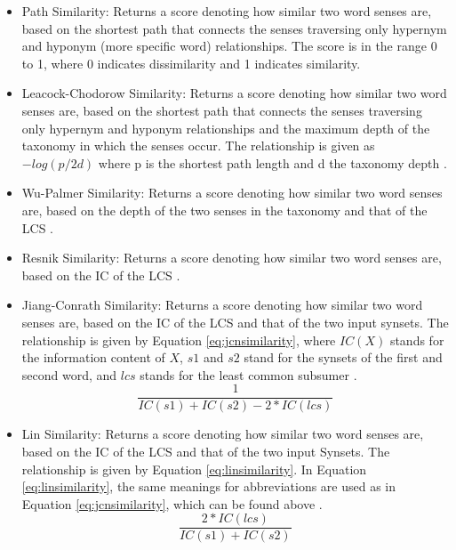 \documentclass{article}
\begin{document}
\begin{itemize}
	\item Path Similarity: Returns a score denoting how similar two word senses are, based on the shortest path that connects the senses traversing only hypernym and hyponym (more specific word) relationships. The score is in the range 0 to 1, where 0 indicates dissimilarity and 1 indicates similarity.
	\item Leacock-Chodorow Similarity: Returns a score denoting how similar two word senses are, based on the shortest path that connects the senses traversing only hypernym and hyponym relationships and the maximum depth of the taxonomy in which the senses occur. The relationship is given as \(-log(p/2d)\) where p is the shortest path length and d the taxonomy depth \cite{leacock1998combining}.
	\item Wu-Palmer Similarity: Returns a score denoting how similar two word senses are, based on the depth of the two senses in the taxonomy and that of the LCS \cite{wu1994verbs}.
	\item Resnik Similarity: Returns a score denoting how similar two word senses are, based on the IC of the LCS \cite{resnik1995using}.
	\item Jiang-Conrath Similarity: Returns a score denoting how similar two word senses are, based on the IC of the LCS and that of the two input synsets. The relationship is given by Equation \ref{eq:jcnsimilarity}, where $IC(X)$ stands for the information content of $X$, $s1$ and $s2$ stand for the synsets of the first and second word, and $lcs$ stands for the least common subsumer \cite{jiang1997semantic}.
\begin{equation} \label{eq:jcnsimilarity}
	\frac{1} {IC(s1) + IC(s2) - 2 * IC(lcs)}
\end{equation}
	\item Lin Similarity: Returns a score denoting how similar two word senses are, based on the IC of the LCS and that of the two input Synsets. The relationship is given by Equation \ref{eq:linsimilarity}. In Equation \ref{eq:linsimilarity}, the same meanings for abbreviations are used as in Equation \ref{eq:jcnsimilarity}, which can be found above \cite{lin1998information}.
\begin{equation} \label{eq:linsimilarity}
	\frac{2 * IC(lcs)} {IC(s1) + IC(s2)} 
\end{equation} 
\end{itemize}
\end{document}
